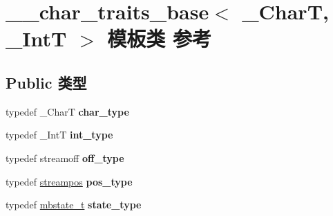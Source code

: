 \hypertarget{class____char__traits__base}{}\section{\+\_\+\+\_\+char\+\_\+traits\+\_\+base$<$ \+\_\+\+CharT, \+\_\+\+IntT $>$ 模板类 参考}
\label{class____char__traits__base}
\subsection*{Public 类型}
\begin{DoxyCompactItemize}
\item 
\mbox{\label{class____char__traits__base_a0afb980aaae0092dc0798ac8443158e6}} 
typedef \+\_\+\+CharT {\bfseries char\+\_\+type}
\item 
\mbox{\label{class____char__traits__base_a37c9d03be93388072770491e9c004e64}} 
typedef \+\_\+\+IntT {\bfseries int\+\_\+type}
\item 
\mbox{\label{class____char__traits__base_a2714cd20629590cbcffd97d9547f4b70}} 
typedef streamoff {\bfseries off\+\_\+type}
\item 
\mbox{\label{class____char__traits__base_a3fb8c46d33fc7247b170b9d52d4c8dd9}} 
typedef \hyperlink{classfpos}{streampos} {\bfseries pos\+\_\+type}
\item 
\mbox{\label{class____char__traits__base_a60da7915d59e73d19e3d78739aca7405}} 
typedef \hyperlink{struct____mbstate__t}{mbstate\+\_\+t} {\bfseries state\+\_\+type}
\end{DoxyCompactItemize}
